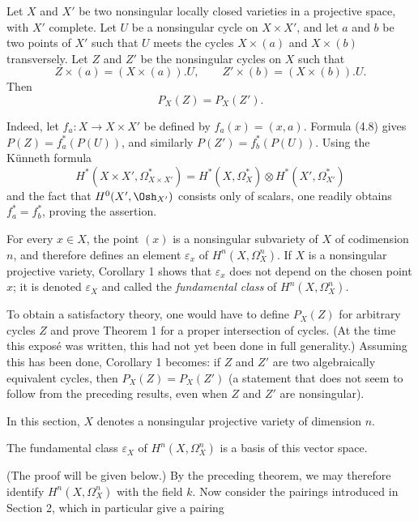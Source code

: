  Let $X$ and $X'$ be two nonsingular locally closed
varieties in a projective space, with $X'$ complete. Let $U$ be a nonsingular
cycle on $X\times X'$, and let $a$ and $b$ be two points of $X'$ such that $U$
meets the cycles $X\times(a)$ and $X\times(b)$ transversely. Let $Z$ and $Z'$ be
the nonsingular cycles on $X$ such that
\[
  Z\times(a)=(X\times(a)).U,
  \qquad
  Z'\times(b)=(X\times(b)).U.
\]
Then
\[
  P_X(Z)=P_X(Z').
\]

Indeed, let $f_a:X\longrightarrow X\times X'$ be defined by
$f_a(x)=(x,a)$. Formula (4.8) gives $P(Z)=f_a^{*}(P(U))$, and similarly
$P(Z')=f_b^{*}(P(U))$. Using the Künneth formula
\[
  H^{*}(X\times X',\Omega_{X\times X'}^{*})
  =H^{*}(X,\Omega_X^{*})\otimes H^{*}(X',\Omega_{X'}^{*})
\]
and the fact that $H^{0}(X',\Osh_{X'})$ consists only of scalars, one readily
obtains $f_a^{*}=f_b^{*}$, proving the assertion.

For every $x\in X$, the point $(x)$ is a nonsingular subvariety of $X$ of
codimension $n$, and therefore defines an element $\varepsilon_x$ of
$H^{n}(X,\Omega_X^{n})$. If $X$ is a nonsingular projective variety, Corollary 1
shows that $\varepsilon_x$ does not depend on the chosen point $x$; it is denoted
$\varepsilon_X$ and called the \emph{fundamental class} of
$H^{n}(X,\Omega_X^{n})$.

 To obtain a satisfactory theory, one would have to define
$P_X(Z)$ for arbitrary cycles $Z$ and prove Theorem 1 for a proper intersection
of cycles. (At the time this exposé was written, this had not yet been done in
full generality.) Assuming this has been done, Corollary 1 becomes: if $Z$ and
$Z'$ are two algebraically equivalent cycles, then $P_X(Z)=P_X(Z')$ (a statement
that does not seem to follow from the preceding results, even when $Z$ and $Z'$
are nonsingular).


In this section, $X$ denotes a nonsingular projective variety of dimension $n$.

 The fundamental class $\varepsilon_X$ of
$H^{n}(X,\Omega_X^{n})$ is a basis of this vector space.

(The proof will be given below.) By the preceding theorem, we may therefore
identify $H^{n}(X,\Omega_X^{n})$ with the field $k$. Now consider the pairings
introduced in Section 2, which in particular give a pairing

